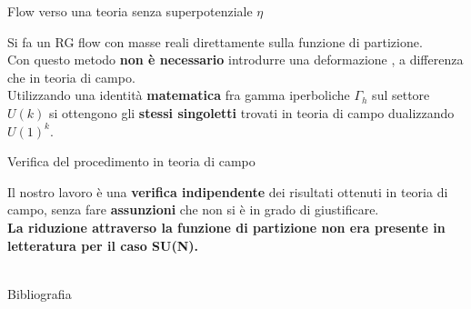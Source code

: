 \documentclass[10pt,compress,usenames,dvipsnames]{beamer}
\begin{document}
\begin{frame}{Flow verso una teoria senza superpotenziale $\eta$}

Si fa un RG flow con masse reali direttamente sulla funzione di partizione.
\\
Con questo metodo \alert{ \bfseries non è necessario} introdurre una deformazione , a differenza che in teoria di campo. \\
\vspace{0.3cm}
Utilizzando una identità \alert{\bfseries matematica} fra gamma iperboliche $\Gamma_h$ sul settore $U(k)$ si ottengono gli \alert{\bfseries stessi singoletti} trovati in teoria di campo dualizzando $U(1)^k$.
\end{frame}


\begin{frame}{Verifica del procedimento in teoria di campo}
\begin{center}
{\large   
Il nostro lavoro è una \alert{\bfseries verifica indipendente} dei risultati ottenuti in teoria di campo, senza fare \alert{\bfseries assunzioni} che non si è in grado di giustificare.
\\[0.3cm]
{\alert{\bfseries La riduzione attraverso la funzione di partizione non era presente in letteratura per il caso SU(N).}
}
} 
\\
\vspace{0.5cm}
\\
\end{center}



\end{frame}



\begin{frame}{Bibliografia}
\nocite{*}
{ \footnotesize

}
\end{frame}
\end{document}

